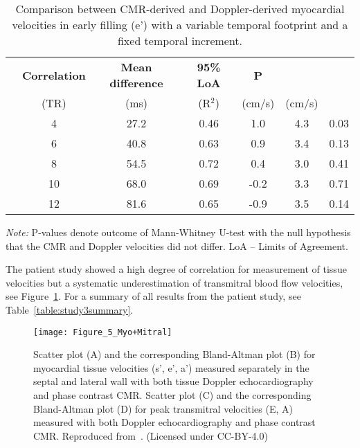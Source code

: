 \begin{table}[htbp]
\caption{Comparison between CMR-derived and Doppler-derived myocardial velocities in early filling (e') with a variable temporal footprint and a fixed temporal increment.}
\begin{center}
\begin{threeparttable}
\begin{tabular}{c c c c c c c}
     \mydarkrowcolor \multicolumn{3}{c}{\textbf{Temporal footprint}} & \textbf{Correlation} & \textbf{Mean difference} & \textbf{95\% LoA} & \textbf{P} \\
     \mydarkrowcolor \quad & (TR) & (ms) & (R$^2$) & (cm/s) & (cm/s) & ~\\
     \quad & 4 & 27.2 & 0.46 & 1.0 & 4.3 & 0.03 \\
     \myrowcolor \quad & 6 & 40.8 & 0.63 & 0.9 & 3.4 & 0.13 \\
     \quad & 8 & 54.5 & 0.72 & 0.4 & 3.0 & 0.41 \\
     \myrowcolor \quad & 10 & 68.0 & 0.69 & -0.2 & 3.3 & 0.71 \\
     \quad & 12 & 81.6 & 0.65 & -0.9 & 3.5 & 0.14 \\
     \bottomrule
\end{tabular}
\begin{tablenotes}
\emph{Note:} P-values denote outcome of Mann-Whitney U-test with the null hypothesis that the CMR and Doppler velocities did not differ. LoA – Limits of Agreement.\\
\end{tablenotes}
\end{threeparttable}
\end{center}
\label{table:study3footprint}
\end{table}

The patient study showed a high degree of correlation for measurement of tissue velocities but a systematic underestimation of transmitral blood flow velocities, see Figure~\ref{fig:study3_3}. For a summary of all results from the patient study, see Table~\ref{table:study3summary}.

\begin{figure}[htbp]
    \centering
    \texttt{[image: Figure\_5\_Myo+Mitral]}
    \caption{Scatter plot (A) and the corresponding Bland-Altman plot (B) for myocardial tissue velocities (s’, e’, a’) measured separately in the septal and lateral wall with both tissue Doppler echocardiography and phase contrast CMR. Scatter plot (C) and the corresponding Bland-Altman plot (D) for peak transmitral velocities (E, A) measured with both Doppler echocardiography and phase contrast CMR. Reproduced from~\cite{Fyrdahl2020}. (Licensed under CC-BY-4.0)}
    \label{fig:study3_3}
\end{figure}

